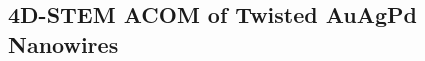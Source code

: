 \documentclass[%
 superscriptaddress,
 aip,
 amsmath,amssymb,
reprint,%
 author-year,%
longbibliography
]{revtex4-2}
\begin{document}








\subsection*{4D-STEM ACOM of Twisted AuAgPd Nanowires}
\end{document}
